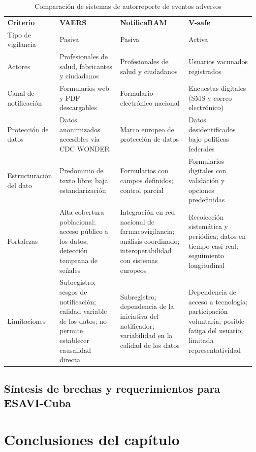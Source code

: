\begin{table}[htbp]
	\centering
	\caption{Comparación de sistemas de autorreporte de eventos adversos}
	\label{tab:sistemas_comparacion}
	
	\renewcommand{\arraystretch}{1.3}
	
	\begin{tabular}{p{3.2cm} p{4.3cm} p{4.3cm} p{4.3cm}}
		
		\textbf{Criterio} & \textbf{VAERS} & \textbf{NotificaRAM} & \textbf{V-safe} \\[6pt]
		
		Tipo de vigilancia &
		Pasiva  &
		Pasiva  &
		Activa  \\[6pt]
		\hline

		Actores &
		Profesionales de salud, fabricantes y ciudadanos &
		Profesionales de salud y ciudadanos &
		Usuarios vacunados registrados \\[6pt]
        \hline
		
		Canal de notificación &
		Formularios web y PDF descargables &
		Formulario electrónico nacional &
		Encuestas digitales (SMS y correo electrónico) \\[6pt]
        \hline
		
		Protección de datos &
		Datos anonimizados accesibles vía CDC WONDER &
		Marco europeo de protección de datos \cite{aemps_fedra_2026} &
		Datos \gls{desidentificados} bajo políticas federales \\[6pt]
        \hline
		
		Estructuración del dato &
		Predominio de texto libre; baja estandarización &
		Formularios con campos definidos; control parcial &
		Formularios digitales con validación y opciones predefinidas
		\\[6pt]
        \hline
		
	
	Fortalezas
	& Alta cobertura poblacional; acceso público a los datos; detección temprana de señales  
	& Integración en red nacional de farmacovigilancia; análisis coordinado; interoperabilidad con sistemas europeos  
	& Recolección sistemática y periódica; datos en tiempo casi real; seguimiento longitudinal  \\[6pt]
    \hline
	
	
	Limitaciones
	& Subregistro; sesgos de notificación; calidad variable de los datos; no permite establecer causalidad directa
	& Subregistro; dependencia de la iniciativa del notificador; variabilidad en la calidad de los datos
	& Dependencia de acceso a tecnología; participación voluntaria; posible fatiga del usuario; limitada representatividad
    

	\end{tabular}
\end{table}




\subsection{Síntesis de brechas y requerimientos para ESAVI-Cuba}





\section{Conclusiones del capítulo}
\label{section:conclusiones_estado_arte}

